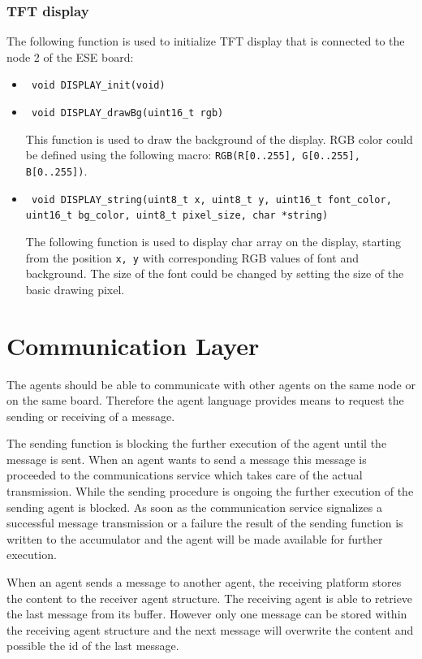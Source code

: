 \documentclass{scrreprt}
\begin{document}
\subsubsection{TFT display}
The following function is used to initialize TFT display that is connected to the node 2 of the ESE board:
\begin{itemize}

\item\texttt{ void DISPLAY_init(void)}

\item\texttt{ void DISPLAY_drawBg(uint16_t rgb)}

This function is used to draw the background of the display. RGB color could be defined using the following macro:
\texttt{RGB(R[0..255], G[0..255], B[0..255])}.

\item\texttt{ void DISPLAY_string(uint8_t x, uint8_t y, uint16_t font_color, uint16_t bg_color, uint8_t pixel_size, char *string)}

The following function is used to display char array on the display, starting from the position \texttt{x, y}
with corresponding RGB values of font and background.
The size of the font could be changed by setting the size of the basic drawing pixel.

\end{itemize}


\section{Communication Layer}

The agents should be able to communicate with other agents on the same node or on the same board. Therefore the agent 
language provides means to request the sending or receiving of a message.  


\noindent
The sending function is blocking the further execution of the agent until the message is sent. 
When an agent wants to send a message this message is proceeded to the communications service which takes care of the 
actual transmission. While the sending procedure is ongoing the further execution of the sending agent is blocked.
As soon as the communication service signalizes a successful message transmission or a failure the result of the 
sending function is written to the accumulator and the agent will be made available for further execution.  


\noindent
When an agent sends a message to another agent, the receiving platform stores the content 
to the receiver agent structure. The receiving agent is able to retrieve the last message from its buffer. 
However only one message can be stored within the receiving agent structure and the next message will overwrite the 
content and possible the id of the last message.  
\end{document}

